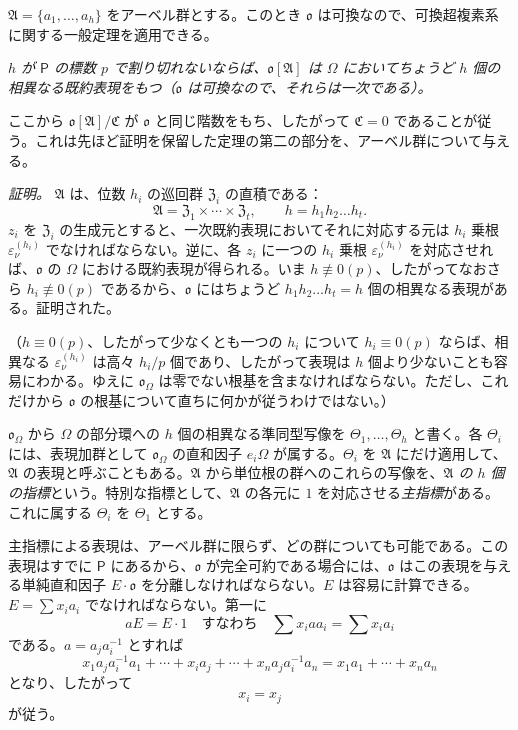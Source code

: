 $\mathfrak A=\{a_1,\ldots,a_h\}$ をアーベル群とする。このとき $\mathfrak o$ は可換なので、可換超複素系に関する一般定理を適用できる。

\emph{$h$ が $\mathsf P$ の標数 $p$ で割り切れないならば、$\mathfrak o[\mathfrak A]$ は $\Omega$ においてちょうど $h$ 個の相異なる既約表現をもつ（$\mathfrak o$ は可換なので、それらは一次である）。}

ここから $\mathfrak o[\mathfrak A]/\mathfrak C$ が $\mathfrak o$ と同じ階数をもち、したがって $\mathfrak C=0$ であることが従う。これは先ほど証明を保留した定理の第二の部分を、アーベル群について与える。

\emph{証明。} $\mathfrak A$ は、位数 $h_i$ の巡回群 $\mathfrak Z_i$ の直積である：
\[
\mathfrak A=\mathfrak Z_1\times\cdots\times\mathfrak Z_t,\qquad
h=h_1h_2\ldots h_t .
\]
$z_i$ を $\mathfrak Z_i$ の生成元とすると、一次既約表現においてそれに対応する元は $h_i$ 乗根 $\varepsilon_\nu^{(h_i)}$ でなければならない。逆に、各 $z_i$ に一つの $h_i$ 乗根 $\varepsilon_\nu^{(h_i)}$ を対応させれば、$\mathfrak o$ の $\Omega$ における既約表現が得られる。いま $h\not\equiv0(p)$、したがってなおさら $h_i\not\equiv0(p)$ であるから、$\mathfrak o$ にはちょうど $h_1h_2\ldots h_t=h$ 個の相異なる表現がある。証明された。

（$h\equiv0(p)$、したがって少なくとも一つの $h_i$ について $h_i\equiv0(p)$ ならば、相異なる $\varepsilon_\nu^{(h_i)}$ は高々 $h_i/p$ 個であり、したがって表現は $h$ 個より少ないことも容易にわかる。ゆえに $\mathfrak o_\Omega$ は零でない根基を含まなければならない。ただし、これだけから $\mathfrak o$ の根基について直ちに何かが従うわけではない。）

$\mathfrak o_\Omega$ から $\Omega$ の部分環への $h$ 個の相異なる準同型写像を $\Theta_1,\ldots,\Theta_h$ と書く。各 $\Theta_i$ には、表現加群として $\mathfrak o_\Omega$ の直和因子 $e_i\Omega$ が属する。$\Theta_i$ を $\mathfrak A$ にだけ適用して、$\mathfrak A$ の表現と呼ぶこともある。$\mathfrak A$ から単位根の群へのこれらの写像を、\emph{$\mathfrak A$ の $h$ 個の指標}という。特別な指標として、$\mathfrak A$ の各元に $1$ を対応させる\emph{主指標}がある。これに属する $\Theta_i$ を $\Theta_1$ とする。

主指標による表現は、アーベル群に限らず、どの群についても可能である。この表現はすでに $\mathsf P$ にあるから、$\mathfrak o$ が完全可約である場合には、$\mathfrak o$ はこの表現を与える単純直和因子 $E\cdot\mathfrak o$ を分離しなければならない。$E$ は容易に計算できる。$E=\sum x_i a_i$ でなければならない。第一に
\[
aE=E\cdot 1\quad\text{すなわち}\quad \sum x_i a a_i=\sum x_i a_i
\]
である。$a=a_j a_i^{-1}$ とすれば
\[
x_1a_ja_i^{-1}a_1+\cdots+x_i a_j+\cdots+x_na_ja_i^{-1}a_n
=x_1a_1+\cdots+x_na_n
\]
となり、したがって
\[
x_i=x_j
\]
が従う。

